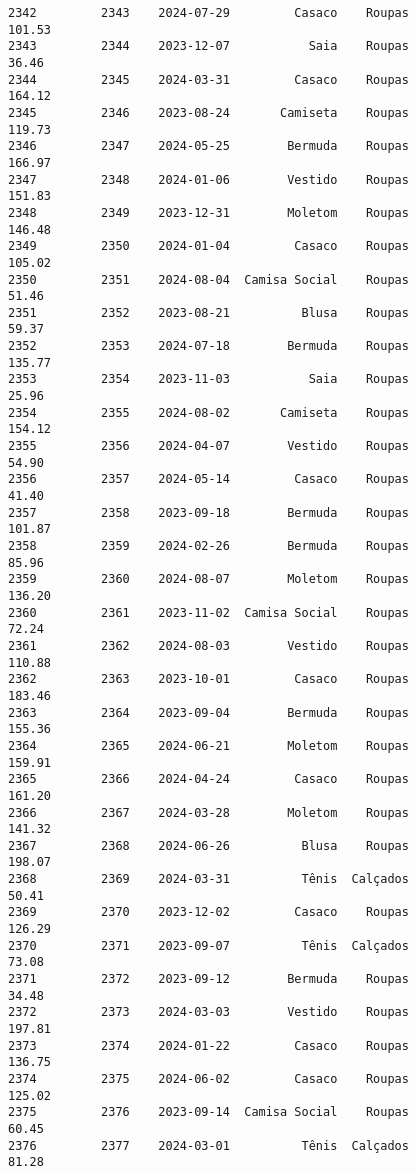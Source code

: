 \documentclass[11pt]{article}
\begin{document}
\begin{Verbatim}[commandchars=\\\{\}]
2342         2343    2024-07-29         Casaco    Roupas          101.53   
2343         2344    2023-12-07           Saia    Roupas           36.46   
2344         2345    2024-03-31         Casaco    Roupas          164.12   
2345         2346    2023-08-24       Camiseta    Roupas          119.73   
2346         2347    2024-05-25        Bermuda    Roupas          166.97   
2347         2348    2024-01-06        Vestido    Roupas          151.83   
2348         2349    2023-12-31        Moletom    Roupas          146.48   
2349         2350    2024-01-04         Casaco    Roupas          105.02   
2350         2351    2024-08-04  Camisa Social    Roupas           51.46   
2351         2352    2023-08-21          Blusa    Roupas           59.37   
2352         2353    2024-07-18        Bermuda    Roupas          135.77   
2353         2354    2023-11-03           Saia    Roupas           25.96   
2354         2355    2024-08-02       Camiseta    Roupas          154.12   
2355         2356    2024-04-07        Vestido    Roupas           54.90   
2356         2357    2024-05-14         Casaco    Roupas           41.40   
2357         2358    2023-09-18        Bermuda    Roupas          101.87   
2358         2359    2024-02-26        Bermuda    Roupas           85.96   
2359         2360    2024-08-07        Moletom    Roupas          136.20   
2360         2361    2023-11-02  Camisa Social    Roupas           72.24   
2361         2362    2024-08-03        Vestido    Roupas          110.88   
2362         2363    2023-10-01         Casaco    Roupas          183.46   
2363         2364    2023-09-04        Bermuda    Roupas          155.36   
2364         2365    2024-06-21        Moletom    Roupas          159.91   
2365         2366    2024-04-24         Casaco    Roupas          161.20   
2366         2367    2024-03-28        Moletom    Roupas          141.32   
2367         2368    2024-06-26          Blusa    Roupas          198.07   
2368         2369    2024-03-31          Tênis  Calçados           50.41   
2369         2370    2023-12-02         Casaco    Roupas          126.29   
2370         2371    2023-09-07          Tênis  Calçados           73.08   
2371         2372    2023-09-12        Bermuda    Roupas           34.48   
2372         2373    2024-03-03        Vestido    Roupas          197.81   
2373         2374    2024-01-22         Casaco    Roupas          136.75   
2374         2375    2024-06-02         Casaco    Roupas          125.02   
2375         2376    2023-09-14  Camisa Social    Roupas           60.45   
2376         2377    2024-03-01          Tênis  Calçados           81.28   

\end{Verbatim}
\end{document}
